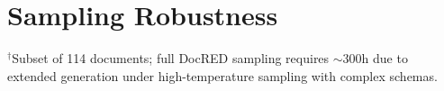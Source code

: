 \section{Sampling Robustness}\label{app:sampling}

\begin{table}[h]
\centering
\caption{Constraint robustness under nucleus sampling ($T$=0.7, $p$=0.9) vs.\ greedy decoding (Qwen3-8B, S1 constraints).}
\label{tab:sampling-robustness}
\par\smallskip\footnotesize $^\dagger$Subset of 114 documents; full DocRED sampling requires ${\sim}300$h due to extended generation under high-temperature sampling with complex schemas.
\end{table}
